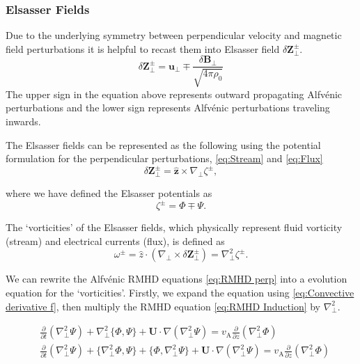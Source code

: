 \subsubsection{Elsasser Fields}
Due to the underlying symmetry between perpendicular velocity and magnetic field perturbations it is helpful to recast them into Elsasser field \( \delta \boldsymbol{Z}_{\perp}^{\pm}\). 
\begin{equation}
    \delta \boldsymbol{Z}_{\perp}^{\pm} = \boldsymbol{u}_{\perp} \mp \frac{\delta \boldsymbol{B}_{\perp}}{\sqrt{4 \pi \rho_{0}}}
    \label{eq:Elsasser}
\end{equation}
The upper sign in the equation above represents outward propagating Alfv\'enic perturbations and the lower sign represents Alfv\'enic perturbations traveling inwards. 


The Elsasser fields can be represented as the following using the potential formulation for the perpendicular perturbations, \eqref{eq:Stream} and \eqref{eq:Flux}
\begin{equation*}
    \delta \boldsymbol{Z}_{\perp}^{\pm}
    = \hat{\boldsymbol{z}} \times \nabla_{\perp} \zeta^{\pm},
\end{equation*}

where we have defined the Elsasser potentials as 
\begin{equation*}
    \zeta^{\pm} = \Phi \mp \Psi.
\end{equation*}

The `vorticities' of the Elsasser fields, which physically represent fluid vorticity (stream) and electrical currents (flux), is defined as
\begin{equation}
    \label{eq:Vorticity}
    \omega^{\pm} = \hat{z} \cdot \left( \nabla_{\perp} \times \delta \boldsymbol{Z}^{\pm}_{\perp} \right) = \nabla_{\perp}^{2} \zeta^{\pm}.
\end{equation}

We can rewrite the Alfv\'enic RMHD equations \eqref{eq:RMHD perp} into a evolution equation for the `vorticities'. Firstly, we expand the equation using \eqref{eq:Convective derivative f}, then multiply the RMHD equation \eqref{eq:RMHD Induction} by \(\nabla^2_{\perp}\).

\begin{equation*}
\begin{split}
    & \frac{\partial}{\partial t} (\nabla^2_{\perp}\Psi)+ \nabla^2_{\perp}\{\Phi, \Psi\} + \boldsymbol{U}\cdot \nabla (\nabla^2_{\perp}\Psi) = v_{\mathrm{A}} \frac{\partial }{\partial z} (\nabla^2_{\perp}\Phi) \\
    &\frac{\partial}{\partial t} (\nabla^2_{\perp}\Psi)+ \{\nabla^2_{\perp}\Phi, \Psi\} + \{\Phi, \nabla^2_{\perp}\Psi\}+ \boldsymbol{U}\cdot \nabla (\nabla^2_{\perp}\Psi) = v_{\mathrm{A}} \frac{\partial }{\partial z} (\nabla^2_{\perp}\Phi)\\
\end{split}
\end{equation*}

